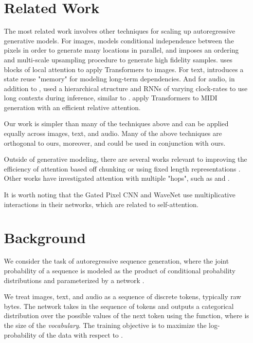 \documentclass{article}
\begin{document}
\section{Related Work}

The most related work involves other techniques for scaling up autoregressive generative models. For images, \cite{reed2017parallel} models conditional independence between the pixels in order to generate many locations in parallel, and \cite{menick2018generating} imposes an ordering and multi-scale upsampling procedure to generate high fidelity samples. \cite{parmar2018image} uses blocks of local attention to apply Transformers to images.  For text, \cite{dai2018transformer} introduces a state reuse "memory" for modeling long-term dependencies. And for audio, in addition to \cite{van2016wavenet}, \cite{mehri2016samplernn} used a hierarchical structure and RNNs of varying clock-rates to use long contexts during inference, similar to \cite{koutnik2014clockwork}. \cite{huang2018improved} apply Transformers to MIDI generation with an efficient relative attention.

Our work is simpler than many of the techniques above and can be applied equally across images, text, and audio. Many of the above techniques are orthogonal to ours, moreover, and could be used in conjunction with ours.

Outside of generative modeling, there are several works relevant to improving the efficiency of attention based off chunking \cite{chiu2017monotonic} or using fixed length representations \cite{britz2017efficient}. Other works have investigated attention with multiple "hops", such as \cite{sukhbaatar2015end} and  \cite{gehring2017convolutional}.

It is worth noting that the Gated Pixel CNN \cite{oord2016pixel} and WaveNet \cite{van2016wavenet} use multiplicative interactions in their networks, which are related to self-attention.

\section{Background}
We consider the task of autoregressive sequence generation, where the joint probability of a sequence  is modeled as the product of conditional probability distributions and parameterized by a network .



We treat images, text, and audio as a sequence of discrete tokens, typically raw bytes. The network  takes in the sequence of tokens and outputs a categorical distribution over the  possible values of the next token using the  function, where  is the size of the \textit{vocabulary}. The training objective is to maximize the log-probability of the data with respect to .
\end{document}
